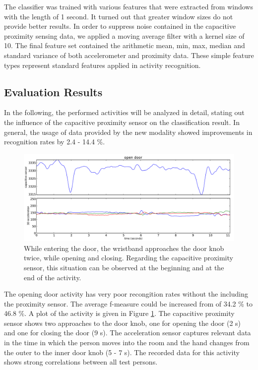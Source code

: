 \documentclass[runningheads,a4paper]{llncs}
\begin{document}
The classifier was trained with various features that were extracted from windows with the length of 1 second. It turned out that greater window sizes do not provide better results. In order to suppress noise contained in the capacitive proximity sensing data, we applied a moving average filter with a kernel size of 10. The final feature set contained the arithmetic mean, min, max, median and standard variance of both accelerometer and proximity data. These simple feature types represent standard features applied in activity recognition. 

\subsection{Evaluation Results}

In the following, the performed activities will be analyzed in detail, stating out the influence of the capacitive proximity sensor on the classification result. In general, the usage of data provided by the new modality showed improvements in recognition rates by 2.4 - 14.4 \%.

\begin{figure}[htbp]
	\centering
		\includegraphics[width=1.00\textwidth]{../Auswertung/images/tobias_1.pdf}
	\caption{While entering the door, the wristband approaches the door knob twice, while opening and closing. Regarding the capacitive proximity sensor, this situation can be observed at the beginning and at the end of the activity.}
	\label{fig:tobias_1}
\end{figure}

The opening door activity has very poor recongition rates without the including the proximity sensor. The average f-measure could be increased from of 34.2 \% to 46.8 \%. A plot of the activity is given in Figure \ref{fig:tobias_1}. The capacitive proximity sensor shows two approaches to the door knob, one for opening the door (2 s) and one for closing the door (9 s). The acceleration sensor captures relevant data in the time in which the person moves into the room and the hand changes from the outer to the inner door knob (5 - 7 s). The recorded data for this activity shows strong correlations between all test persons. 
\end{document}
